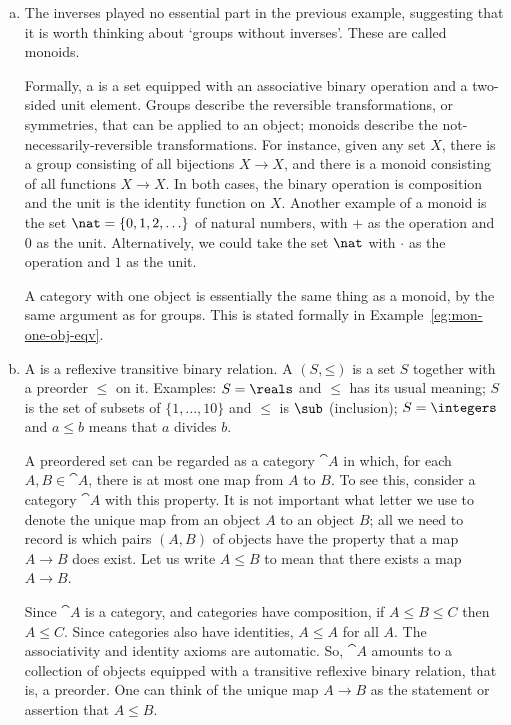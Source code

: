 \begin{examples}
\begin{enumerate}[(b)]
\item   
\label{eg:cats-as:monoids}
The inverses played no essential part in the previous example, suggesting that
it is worth thinking about `groups without inverses'.  These are called
monoids.  

Formally, a %
%
%
is a set equipped with an associative binary operation and a two-sided unit
element.  Groups describe the reversible transformations, or symmetries,
that can be applied to an object; monoids describe the
not-necessarily-reversible transformations.  For instance, given any set
$X$, there is a group consisting of all bijections $X \to X$, and there is
a monoid consisting of all functions $X \to X$.  In both cases, the binary
operation is composition and the unit is the identity function on $X$.
Another example of a monoid is the set $\nat = \{0, 1, 2, \ldots\}$%
%
%
of natural%
%
%
numbers, with $+$ as the operation and $0$ as the unit.  Alternatively, we
could take the set $\nat$ with $\cdot$ as the operation and $1$ as the
unit.

A category with one%
%
%
object is essentially the same thing as a monoid, by the same argument as
for groups.  This is stated formally in Example~\ref{eg:mon-one-obj-eqv}.%
%
%

\item   
\label{eg:cats-as:orders}
A %
%
%
is a reflexive transitive binary relation.  A  $(S,
\mathord{\leq})$%
%
%
is a set $S$ together with a preorder $\leq$ on it.  Examples: $S = \reals$
and $\leq$ has its usual meaning; $S$ is the set of subsets of $\{1,
\ldots, 10\}$ and $\leq$ is $\sub$ (inclusion); $S = \integers$ and $a \leq
b$ means that $a$ divides $b$.

A preordered set can be regarded as a category $\cat{A}$ in which, for each
$A, B \in \cat{A}$, there is at most one map from $A$ to $B$.  To see this,
consider a category $\cat{A}$ with this property.  It is not important what
letter we use to denote the unique map from an object $A$ to an object $B$;
all we need to record is which pairs $(A, B)$ of objects have the property
that a map $A \to B$ does exist.  Let us write $A \leq B$ to mean that
there exists a map $A \to B$.

Since $\cat{A}$ is a category, and categories have composition, if $A \leq
B \leq C$ then $A \leq C$.  Since categories also have identities, $A \leq
A$ for all $A$.  The associativity and identity axioms are automatic.  So,
$\cat{A}$ amounts to a collection of objects equipped with a transitive
reflexive binary relation, that is, a preorder.  One can think of the
unique map $A \to B$ as the statement or assertion that $A \leq B$.


\end{enumerate}
\end{examples}
